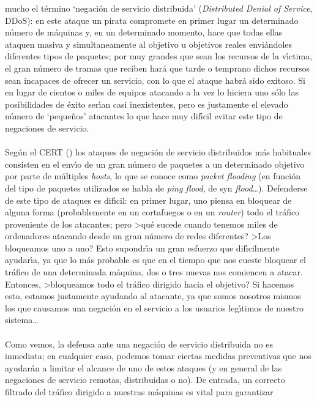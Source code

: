 mucho el t\'ermino `negaci\'on de servicio distribuida' ({\it Distributed 
Denial of Service}, DDoS): en este ataque un pirata compromete en primer lugar 
un determinado n\'umero de m\'aquinas y, en un determinado momento, hace que 
todas ellas ataquen masiva y simultaneamente al objetivo u objetivos reales 
envi\'andoles diferentes tipos de
paquetes; por muy grandes que sean los recursos de la v\'{\i}ctima, el gran
n\'umero de tramas que reciben har\'a que tarde o temprano dichos recursos sean
incapaces de ofrecer un servicio, con lo que el ataque habr\'a sido exitoso.
Si en lugar de cientos o miles de equipos atacando a la vez lo hiciera uno 
s\'olo las posibilidades de \'exito ser\'{\i}an casi inexistentes, pero es 
justamente el elevado n\'umero de `peque\~nos' atacantes lo que hace muy
dif\'{\i}cil evitar este tipo de negaciones de servicio.\\
\\Seg\'un el CERT (\cite{kn:hou01}) los ataques de negaci\'on de servicio 
distribuidos m\'as habituales consisten en el env\'{\i}o de un gran n\'umero de 
paquetes a un determinado objetivo por parte de m\'ultiples {\it hosts}, lo que 
se conoce como {\it packet flooding} (en funci\'on del tipo de paquetes 
utilizados se habla de {\it ping flood}, de {\sc syn} {\it flood}\ldots). 
Defenderse de este tipo de ataques es dif\'{\i}cil: en primer lugar, uno piensa
en bloquear de alguna forma (probablemente en un cortafuegos o en un {\it 
router}) todo el tr\'afico proveniente de los atacantes; pero >qu\'e sucede 
cuando tenemos miles de ordenadores atacando desde un gran n\'umero de redes 
diferentes? >Los bloqueamos uno a uno? Esto supondr\'{\i}a un gran esfuerzo que
dif\'{\i}cilmente ayudar\'{\i}a, ya que lo m\'as probable es que en el tiempo
que nos cueste bloquear el tr\'afico de una determinada m\'aquina, dos o tres
nuevas nos comiencen a atacar. Entonces, >bloqueamos todo el tr\'afico dirigido
hacia el objetivo? Si hacemos esto, estamos justamente ayudando al atacante, ya
que somos nosotros mismos los que causamos una negaci\'on en el servicio a los 
usuarios leg\'{\i}timos de nuestro sistema\ldots\\
\\Como vemos, la defensa ante una negaci\'on de servicio distribuida no es 
inmediata; en cualquier caso, podemos tomar ciertas medidas preventivas que nos 
ayudar\'an a limitar el alcance de uno de estos ataques (y en general de las
negaciones de servicio remotas, distribuidas o no). De entrada, un correcto
filtrado del tr\'afico dirigido a nuestras m\'aquinas es vital para garantizar 
